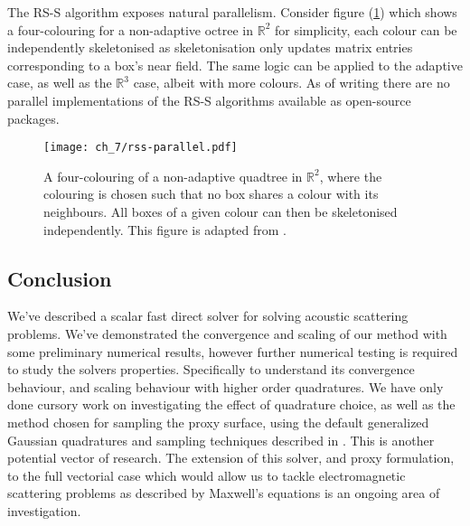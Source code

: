 The RS-S algorithm exposes natural parallelism. Consider figure (\ref{fig:ch_7:rss_parallel}) which shows a four-colouring for a non-adaptive octree in $\mathbb{R}^2$ for simplicity, each colour can be independently skeletonised as skeletonisation only updates matrix entries corresponding to a box's near field. The same logic can be applied to the adaptive case, as well as the $\mathbb{R}^3$ case, albeit with more colours. As of writing there are no parallel implementations of the RS-S algorithms available as open-source packages.

\begin{figure}
    \centering
    \texttt{[image: ch\_7/rss-parallel.pdf]}
    \caption{A four-colouring of a non-adaptive quadtree in $\mathbb{R}^2$, where the colouring is chosen such that no box shares a colour with its neighbours. All boxes of a given colour can then be skeletonised independently. This figure is adapted from \cite{minden2017recursive}.}
    \label{fig:ch_7:rss_parallel}
\end{figure}

\subsection*{Conclusion}

We've described a scalar fast direct solver for solving acoustic scattering problems. We've demonstrated the convergence and scaling of our method with some preliminary numerical results, however further numerical testing is required to study the solvers properties. Specifically to understand its convergence behaviour, and scaling behaviour with higher order quadratures. We have only done cursory work on investigating the effect of quadrature choice, as well as the method chosen for sampling the proxy surface, using the default generalized Gaussian quadratures and sampling techniques described in \cite{sushnikova2022fmm}. This is another potential vector of research. The extension of this solver, and proxy formulation, to the full vectorial case which would allow us to tackle electromagnetic scattering problems as described by Maxwell's equations is an ongoing area of investigation.